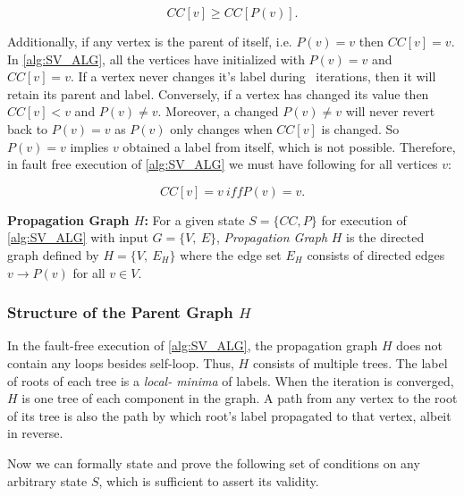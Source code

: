 \begin{equation}
\label{eq:ccv-ccp}
CC[v] \geq CC[P(v)].
 \end{equation}

Additionally, if any vertex is the parent of itself, i.e. $P(v)=v$ then
$CC[v]=v$.  In \cref{alg:SV_ALG}, all the vertices have initialized with
$P(v)=v$ and $CC[v]=v$. If a vertex never changes it's label during
\sv~iterations, then it will retain its parent and label. Conversely, if a
vertex has changed its value then $CC[v]<v$ and $P(v)\neq v$. Moreover, a
changed $P(v)\neq v$ will never revert back to $P(v)=v$ as $P(v)$  only
changes when $CC[v]$ is changed. So $P(v)=v$ implies $v$ obtained a label from
itself, which is not possible. Therefore, in fault free execution of
\cref{alg:SV_ALG} we must have following for all vertices $v$:

\begin{equation}
\label{eq:root-cc}
CC[v] = v \ iff P(v)=v.
\end{equation}
 


\begin{defn}{ \textbf {Propagation Graph $H$:} }
\label{def:prforH}
For a given state $S=\{ CC, P\}$ for execution of \cref{alg:SV_ALG} with input 
$G=\{V,\ E\}$,  \emph{Propagation Graph} $H$ is the directed graph defined by $H=\{V,\ E_{H}\}$ where the edge set $E_{H}$ consists of directed edges $v\rightarrow P(v)$ for all $v \in V$. 
\end{defn}

\subsubsection{ Structure of the Parent Graph $H$} In the fault-free execution of
\cref{alg:SV_ALG}, the propagation graph $H$ does not contain any loops
besides self-loop. Thus, $H$ consists of multiple trees.  The label of roots
of each tree is a \emph{local- minima} of labels. When the iteration is
converged, $H$ is one tree of each component in the graph. A path from any
vertex to the root of its tree is also the path by which root's label propagated 
to that vertex, albeit in reverse.

Now we can formally state and prove the following set of conditions on any arbitrary state $S$, which is sufficient to assert its validity.

